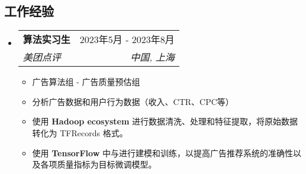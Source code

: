 \documentclass[letterpaper,11pt]{article}
\makeatletter
\newcommand{\resumeItem}[1]{
  \item\small{
    {#1 \vspace{-2pt}}
  }
}
\newcommand{\resumeSubheading}[4]{
  \vspace{-2pt}\item
  \begin{tabular*}{0.97\textwidth}[t]{l@{\extracolsep{\fill}}r}
    \textbf{#1} & #2 \\
    \textit{\small#3} & \textit{\small #4} \\
  \end{tabular*}\vspace{-7pt}
}
\newcommand{\resumeSubSubheading}[2]{
  \item
  \begin{tabular*}{0.97\textwidth}{l@{\extracolsep{\fill}}r}
    \textit{\small#1} & \textit{\small #2} \\
  \end{tabular*}\vspace{-7pt}
}
\newcommand{\resumeSubHeadingListStart}{\begin{itemize}[leftmargin=0.15in, label={}]}
\newcommand{\resumeSubHeadingListEnd}{\end{itemize}}
\newcommand{\resumeItemListStart}{\begin{itemize}}
\newcommand{\resumeItemListEnd}{\end{itemize}\vspace{-5pt}}
\makeatother
\begin{document}
\begin{CJK*}{UTF8}{gbsn}




  \section{工作经验}
  \resumeSubHeadingListStart

  \resumeSubheading
  {算法实习生}{2023年5月 - 2023年8月}
  {美团点评}{中国, 上海}
  \resumeItemListStart
  \resumeItem{广告算法组 - 广告质量预估组}
  \resumeItem{分析广告数据和用户行为数据（收入、CTR、CPC等）}
  \resumeItem{使用 \textbf{ Hadoop ecosystem} 进行数据清洗、处理和特征提取，将原始数据转化为 TFRecords 格式。}
  \resumeItem{使用 \textbf{ TensorFlow} 中与进行建模和训练，以提高广告推荐系统的准确性以及各项质量指标为目标微调模型。}
  \resumeItemListEnd
  \resumeSubHeadingListEnd


\end{CJK*}
\end{document}
